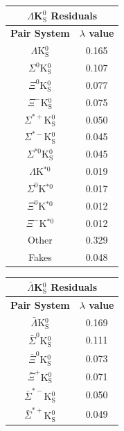 \documentclass[../AnalysisNoteJBuxton.tex]{subfiles}
\begin{document}
\begin{table}[htbp]
 \centering
 \begin{minipage}{0.3\textwidth}
  \centering 
  \begin{tabular}{|c|c|}
   \multicolumn{2}{c}{$\Lambda$K$^{0}_{\mathrm{S}}$ Residuals} \\
   \hline
   \textbf{Pair System} & \textbf{$\lambda$ value} \\
   \hline
   $\Lambda$K$^{0}_{\mathrm{S}}$ & 0.165 \\
   $\Sigma^{0}$K$^{0}_{\mathrm{S}}$ & 0.107 \\
   $\Xi^{0}$K$^{0}_{\mathrm{S}}$ & 0.077 \\
   $\Xi^{-}$K$^{0}_{\mathrm{S}}$ & 0.075 \\
   $\Sigma^{*+}$K$^{0}_{\mathrm{S}}$ & 0.050 \\
   $\Sigma^{*-}$K$^{0}_{\mathrm{S}}$ & 0.045 \\
   $\Sigma^{*0}$K$^{0}_{\mathrm{S}}$ & 0.045 \\
   $\Lambda$K$^{*0}$ & 0.019 \\
   $\Sigma^{0}$K$^{*0}$ & 0.017 \\
   $\Xi^{0}$K$^{*0}$ & 0.012 \\
   $\Xi^{-}$K$^{*0}$ & 0.012 \\
   Other & 0.329 \\
   Fakes & 0.048 \\
   \hline
  \end{tabular}
 \end{minipage} 
 \begin{minipage}{0.3\textwidth}
  \centering 
  \begin{tabular}{|c|c|}
   \multicolumn{2}{c}{$\bar{\Lambda}$K$^{0}_{\mathrm{S}}$ Residuals} \\
   \hline
   \textbf{Pair System} & \textbf{$\lambda$ value} \\
   \hline
   $\bar{\Lambda}$K$^{0}_{\mathrm{S}}$ & 0.169 \\
   $\bar{\Sigma}^{0}$K$^{0}_{\mathrm{S}}$ & 0.111 \\
   $\bar{\Xi}^{0}$K$^{0}_{\mathrm{S}}$ & 0.073 \\
   $\bar{\Xi}^{+}$K$^{0}_{\mathrm{S}}$ & 0.071 \\
   $\bar{\Sigma}^{*-}$K$^{0}_{\mathrm{S}}$ & 0.050 \\
   $\bar{\Sigma}^{*+}$K$^{0}_{\mathrm{S}}$ & 0.049 \\

\end{tabular}
\end{minipage}
\end{table}
\end{document}
